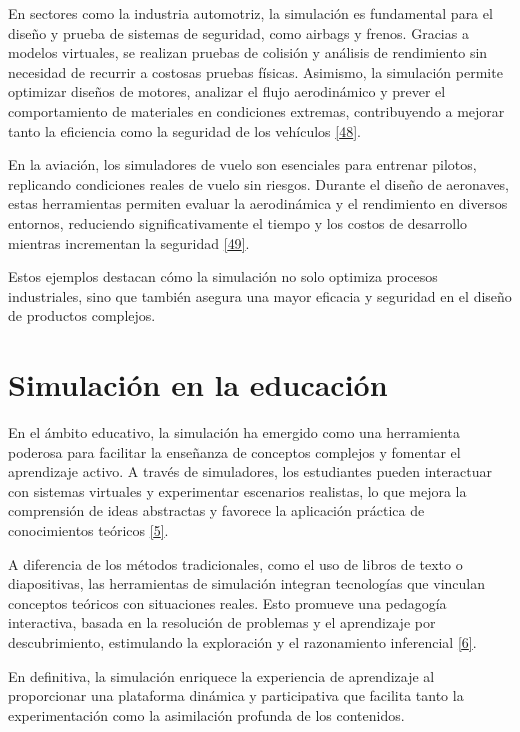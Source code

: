 \documentclass[12pt,oneside]{templates/unerthesis}
\begin{document}
En sectores como la industria automotriz, la simulación es fundamental para el diseño y prueba de sistemas de seguridad, como airbags y frenos. Gracias a modelos virtuales, se realizan pruebas de colisión y análisis de rendimiento sin necesidad de recurrir a costosas pruebas físicas. Asimismo, la simulación permite optimizar diseños de motores, analizar el flujo aerodinámico y prever el comportamiento de materiales en condiciones extremas, contribuyendo a mejorar tanto la eficiencia como la seguridad de los vehículos \protect\hyperlink{ref-stork_towards_2008}{{[}48{]}}.

En la aviación, los simuladores de vuelo son esenciales para entrenar pilotos, replicando condiciones reales de vuelo sin riesgos. Durante el diseño de aeronaves, estas herramientas permiten evaluar la aerodinámica y el rendimiento en diversos entornos, reduciendo significativamente el tiempo y los costos de desarrollo mientras incrementan la seguridad \protect\hyperlink{ref-jentsch_simulation_2017}{{[}49{]}}.

Estos ejemplos destacan cómo la simulación no solo optimiza procesos industriales, sino que también asegura una mayor eficacia y seguridad en el diseño de productos complejos.

\hypertarget{simulaciuxf3n-en-la-educaciuxf3n}{%
\section{Simulación en la educación}\label{simulaciuxf3n-en-la-educaciuxf3n}}

En el ámbito educativo, la simulación ha emergido como una herramienta poderosa para facilitar la enseñanza de conceptos complejos y fomentar el aprendizaje activo. A través de simuladores, los estudiantes pueden interactuar con sistemas virtuales y experimentar escenarios realistas, lo que mejora la comprensión de ideas abstractas y favorece la aplicación práctica de conocimientos teóricos \protect\hyperlink{ref-lion_simuladores_2005}{{[}5{]}}.

A diferencia de los métodos tradicionales, como el uso de libros de texto o diapositivas, las herramientas de simulación integran tecnologías que vinculan conceptos teóricos con situaciones reales. Esto promueve una pedagogía interactiva, basada en la resolución de problemas y el aprendizaje por descubrimiento, estimulando la exploración y el razonamiento inferencial \protect\hyperlink{ref-contreras_uso_2010}{{[}6{]}}.

En definitiva, la simulación enriquece la experiencia de aprendizaje al proporcionar una plataforma dinámica y participativa que facilita tanto la experimentación como la asimilación profunda de los contenidos.
\end{document}
